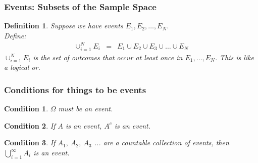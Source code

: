 \documentclass{beamer}
\newtheorem{condition}{Condition}
\newtheorem{defn}{Definition}
\numberwithin{equation}{section}
\begin{document}
\begin{frame}
\frametitle{Events: Subsets of the Sample Space}

\begin{defn}
Suppose we have events $E_{1}, E_{2}, \hdots, E_{N}$.  \\
Define: 
\begin{eqnarray}
\cup_{i=1}^{N} E_{i} & = & E_{1} \cup E_{2} \cup E_{3} \cup \hdots \cup E_{N} \nonumber
\end{eqnarray}
 $\cup_{i=1}^{N} E_{i} $ is the set of outcomes that occur at least once in $E_{1} , \hdots, E_{N}$.  This is like a logical or. \pause \\


\end{defn}


\end{frame}




\begin{frame}
\frametitle{Conditions for things to be events}


\begin{condition}
$\Omega$ must be an event. \\
\end{condition}


\begin{condition}
If $A$ is an event, $A^c$ is an event. \\
\end{condition}


\begin{condition}
If $A_1,\ A_2,\ A_3$ ... are a countable collection of events, then $\bigcup_{i=1}^\infty A_i$ is an event. \\
\end{condition}


\end{frame}
\end{document}
